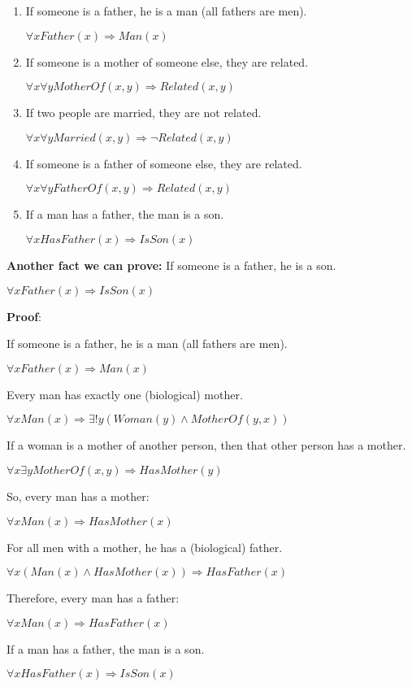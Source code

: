 \documentclass[12pt]{article}
\begin{document}
\begin{enumerate}
\item If someone is a father, he is a man (all fathers are men).

$\forall x Father(x) \Rightarrow Man(x)$

\item If someone is a mother of someone else, they are related.

$\forall x \forall y MotherOf(x,y) \Rightarrow Related(x,y)$

\item If two people are married, they are not related.

$\forall x \forall y Married(x,y) \Rightarrow \lnot Related(x,y)$

\item If someone is a father of someone else, they are related.

$\forall x \forall y FatherOf(x,y) \Rightarrow Related(x,y)$

\item If a man has a father, the man is a son.

$\forall x HasFather(x) \Rightarrow IsSon(x)$

\end{enumerate}

\textbf{Another fact we can prove:}
If someone is a father, he is a son.

$\forall x Father(x) \Rightarrow IsSon(x)$

\textbf{Proof}: 

If someone is a father, he is a man (all fathers are men).

$\forall x Father(x) \Rightarrow Man(x)$

Every man has exactly one (biological) mother.

$\forall x Man(x) \Rightarrow \exists! y (Woman(y) \land MotherOf(y, x))$

If a woman is a mother of another person, then that other person has a mother.

$\forall x \exists y MotherOf(x, y) \Rightarrow HasMother(y)$

So, every man has a mother:

$\forall x Man(x) \Rightarrow HasMother(x)$

For all men with a mother, he has a (biological) father.

$\forall x (Man(x) \land HasMother(x)) \Rightarrow HasFather(x)$ 

Therefore, every man has a father:

$\forall x Man(x) \Rightarrow HasFather(x)$

If a man has a father, the man is a son.

$\forall x HasFather(x) \Rightarrow IsSon(x)$
\end{document}

